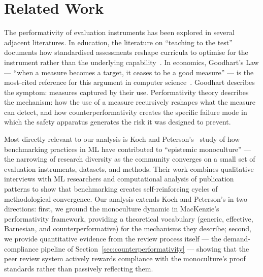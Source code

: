 \documentclass{article}
\begin{document}
\section{Related Work}
\label{sec:related}

The performativity of evaluation instruments has been explored in several adjacent literatures. In education, the literature on ``teaching to the test'' documents how standardised assessments reshape curricula to optimise for the instrument rather than the underlying capability~\citep{au_high_2007}. In economics, Goodhart's Law --- ``when a measure becomes a target, it ceases to be a good measure'' --- is the most-cited reference for this argument in computer science~\citep{goodhart_1975}. Goodhart describes the symptom: measures captured by their use. Performativity theory describes the mechanism: how the use of a measure recursively reshapes what the measure can detect, and how counterperformativity creates the specific failure mode in which the safety apparatus generates the risk it was designed to prevent.

Most directly relevant to our analysis is Koch and Peterson's~\citep{koch_peterson_2024} study of how benchmarking practices in ML have contributed to ``epistemic monoculture'' --- the narrowing of research diversity as the community converges on a small set of evaluation instruments, datasets, and methods. Their work combines qualitative interviews with ML researchers and computational analysis of publication patterns to show that benchmarking creates self-reinforcing cycles of methodological convergence. Our analysis extends Koch and Peterson's in two directions: first, we ground the monoculture dynamic in MacKenzie's performativity framework, providing a theoretical vocabulary (generic, effective, Barnesian, and counterperformative) for the mechanisms they describe; second, we provide quantitative evidence from the review process itself --- the demand-compliance pipeline of Section~\ref{sec:counterperformativity} --- showing that the peer review system actively rewards compliance with the monoculture's proof standards rather than passively reflecting them.
\end{document}
